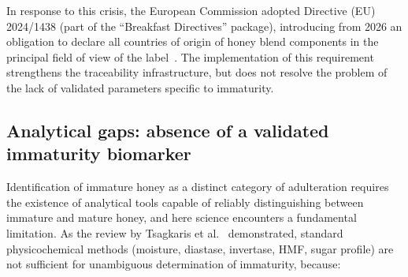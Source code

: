 In response to this crisis, the European Commission adopted
Directive (EU) 2024/1438 (part of the ``Breakfast Directives''
package), introducing from 2026 an obligation to declare all
countries of origin of honey blend components in the principal
field of view of the label~\cite{cbi_traceability2024}. The
implementation of this requirement strengthens the traceability
infrastructure, but does not resolve the problem of the lack of
validated parameters specific to immaturity.

\subsection{Analytical gaps: absence of a validated immaturity biomarker}

Identification of immature honey as a distinct category of
adulteration requires the existence of analytical tools capable of
reliably distinguishing between immature and mature honey, and here
science encounters a fundamental limitation. As the review by
Tsagkaris et al.~\cite{tsagkaris2021} demonstrated, standard
physicochemical methods (moisture, diastase, invertase, HMF,
sugar profile) are not sufficient for unambiguous determination
of immaturity, because:

